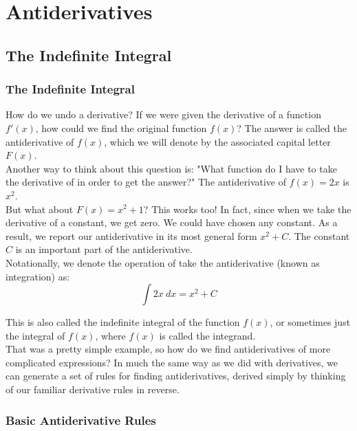 \part{Antiderivatives}

\chapter{The Indefinite Integral}

\section{The Indefinite Integral}

How do we undo a derivative? If we were given the derivative of a function $ f'(x) $, how could we find the original function $ f(x) $? The answer is called the antiderivative of $ f(x) $, which we will denote by the associated capital letter $ F(x) $. \\

Another way to think about this question is: "What function do I have to take the derivative of in order to get the answer?" The antiderivative of $ f(x) = 2x $ is $ x^2 $. \\

But what about $ F(x) = x^2 + 1 $? This works too! In fact, since when we take the derivative of a constant, we get zero. We could have chosen any constant. As a result, we report our antiderivative in its most general form $ x^2 + C $. The constant $ C $ is an important part of the antiderivative. \\

Notationally, we denote the operation of take the antiderivative (known as integration) as: \\

$$
    \int 2x \ dx = x^2 + C
$$

This is also called the indefinite integral of the function $ f(x) $, or sometimes just the integral of $ f(x) $, where $ f(x) $ is called the integrand. \\

That was a pretty simple example, so how do we find antiderivatives of more complicated expressions? In much the same way as we did with derivatives, we can generate a set of rules for finding antiderivatives, derived simply by thinking of our familiar derivative rules in reverse. \\

\section{Basic Antiderivative Rules}

